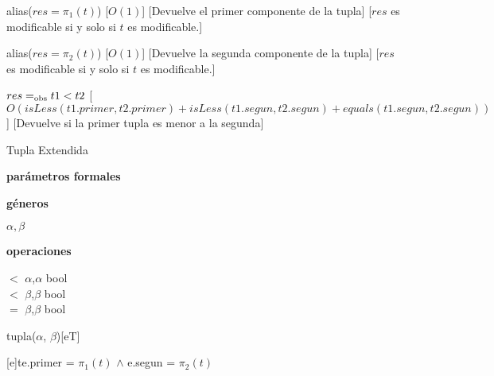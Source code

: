 \begin{Interfaz}
	{alias($res = \pi_1 (t)$)}
	[$O(1)$]
	[Devuelve el primer componente de la tupla]
	[$res$ es modificable si y solo si $t$ es modificable.]

	{alias($res = \pi_2 (t)$)}
	[$O(1)$]
	[Devuelve la segunda componente de la tupla]
	[$res$ es modificable si y solo si $t$ es modificable.]

	{$res =_{\mathrm{obs}} t1 < t2$}
	[$O(isLess(t1.primer, t2.primer) + isLess(t1.segun, t2.segun) + equals(t1.segun, t2.segun))$]
	[Devuelve si la primer tupla es menor a la segunda]


	\begin{tad}{Tupla Extendida}
	\parskip=0pt

	\textbf{parámetros formales}\parindent\\
	\parbox{1.7cm}{\textbf{géneros}}$\alpha,\beta$\\
	\parbox{\parindent+1.7cm}{\textbf{operaciones}}\parbox[t]{\textwidth-\parindent-1.7cm}{
		\tadOperacionInline
		{\puntito $<$ \puntito}
		{$\alpha$,$\alpha$}
		{bool}\\
		\tadOperacionInline
		{\puntito $<$ \puntito}
		{$\beta$,$\beta$}
		{bool}\\
		\tadOperacionInline
		{\puntito $=$ \puntito}
		{$\beta$,$\beta$}
		{bool}
	}


	
	\tadAxiomas


	\end{tad}

\end{Interfaz}


\begin{Representacion}

	\begin{Estructura}{tupla($\alpha$, $\beta$)}[eT]
		\begin{Tupla}[eT]
		\end{Tupla}
	\end{Estructura}





	{t}{e.primer = $\pi_1 (t)$ $\land$ e.segun = $\pi_2 (t)$}
\end{Representacion}


